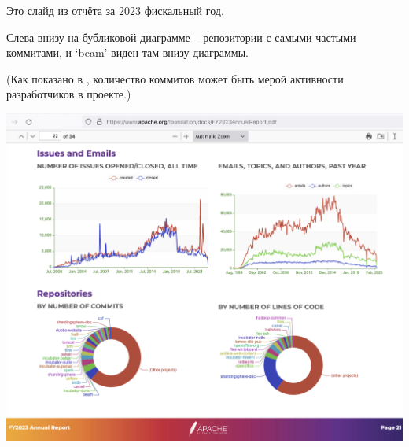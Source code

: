 
Это слайд из отчёта \Asf за 2023 фискальный год.

Слева внизу на бубликовой диаграмме -- репозитории с самыми частыми коммитами,
и `beam' виден там внизу диаграммы.

(Как показано в , количество коммитов может быть мерой
активности разработчиков в проекте.)

\includegraphics[width=\textwidth]{beam-commits}

\pagebreak
